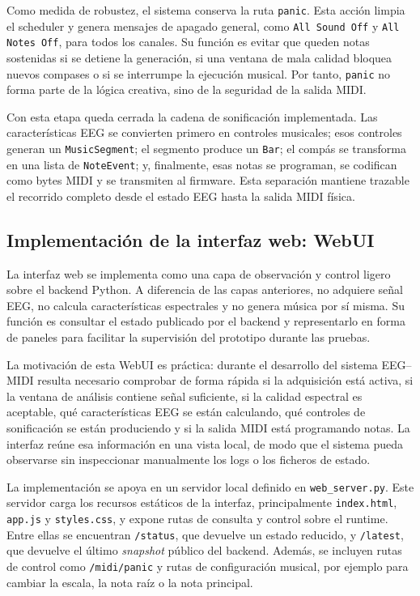 \documentclass[../main.tex]{subfiles}
\begin{document}
Como medida de robustez, el sistema conserva la ruta \texttt{panic}. Esta acción limpia el scheduler y genera mensajes de apagado general, como \texttt{All Sound Off} y \texttt{All Notes Off}, para todos los canales. Su función es evitar que queden notas sostenidas si se detiene la generación, si una ventana de mala calidad bloquea nuevos compases o si se interrumpe la ejecución musical. Por tanto, \texttt{panic} no forma parte de la lógica creativa, sino de la seguridad de la salida MIDI.


Con esta etapa queda cerrada la cadena de sonificación implementada. Las características EEG se convierten primero en controles musicales; esos controles generan un \texttt{MusicSegment}; el segmento produce un \texttt{Bar}; el compás se transforma en una lista de \texttt{NoteEvent}; y, finalmente, esas notas se programan, se codifican como bytes MIDI y se transmiten al firmware. Esta separación mantiene trazable el recorrido completo desde el estado EEG hasta la salida MIDI física.

\subsection[Implementación de la interfaz web]{Implementación de la interfaz web: WebUI}
La interfaz web se implementa como una capa de observación y control ligero sobre el backend Python. A diferencia de las capas anteriores, no adquiere señal EEG, no calcula características espectrales y no genera música por sí misma. Su función es consultar el estado publicado por el backend y representarlo en forma de paneles para facilitar la supervisión del prototipo durante las pruebas.

La motivación de esta WebUI es práctica: durante el desarrollo del sistema EEG--MIDI resulta necesario comprobar de forma rápida si la adquisición está activa, si la ventana de análisis contiene señal suficiente, si la calidad espectral es aceptable, qué características EEG se están calculando, qué controles de sonificación se están produciendo y si la salida MIDI está programando notas. La interfaz reúne esa información en una vista local, de modo que el sistema pueda observarse sin inspeccionar manualmente los logs o los ficheros de estado.

La implementación se apoya en un servidor local definido en \texttt{web\_server.py}. Este servidor carga los recursos estáticos de la interfaz, principalmente \texttt{index.html}, \texttt{app.js} y \texttt{styles.css}, y expone rutas de consulta y control sobre el runtime. Entre ellas se encuentran \texttt{/status}, que devuelve un estado reducido, y \texttt{/latest}, que devuelve el último \textit{snapshot} público del backend. Además, se incluyen rutas de control como \texttt{/midi/panic} y rutas de configuración musical, por ejemplo para cambiar la escala, la nota raíz o la nota principal.
\end{document}
